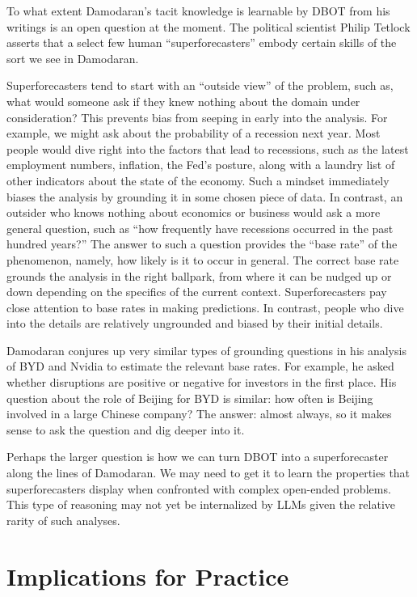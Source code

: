 \documentclass[]{interact}
\theoremstyle{plain}%
\theoremstyle{definition}
\theoremstyle{remark}
\begin{document}
To what extent Damodaran’s tacit knowledge is learnable by DBOT from his writings is an open question at the moment. The political scientist Philip Tetlock asserts that a select few human ``superforecasters'' embody certain skills of the sort we see in Damodaran. 

Superforecasters tend to start with an ``outside view'' of the problem, such as, what would someone ask if they knew nothing about the domain under consideration? This prevents bias from seeping in early into the analysis. For example, we might ask about the probability of a recession next year. Most people would dive right into the factors that lead to recessions, such as the latest employment numbers, inflation, the Fed’s posture, along with a laundry list of other indicators about the state of the economy. Such a mindset immediately biases the analysis by grounding it in some chosen piece of data. In contrast, an outsider who knows nothing about economics or business would ask a more general question, such as ``how frequently have recessions occurred in the past hundred years?'' The answer to such a question provides the “base rate” of the phenomenon, namely, how likely is it to occur in general. The correct base rate grounds the analysis in the right ballpark, from where it can be nudged up or down depending on the specifics of the current context. Superforecasters pay close attention to base rates in making predictions. In contrast, people who dive into the details are relatively ungrounded and biased by their initial details.

Damodaran conjures up very similar types of grounding questions in his analysis of BYD and Nvidia to estimate the relevant base rates. For example, he asked whether disruptions are positive or negative for investors in the first place. His question about the role of Beijing for BYD is similar: how often is Beijing involved in a large Chinese company? The answer: almost always, so it makes sense to ask the question and dig deeper into it.

Perhaps the larger question is how we can turn DBOT into a superforecaster along the lines of Damodaran. We may need to get it to learn the properties that superforecasters display when confronted with complex open-ended problems. This type of reasoning may not yet be internalized by LLMs given the relative rarity of such analyses.


\section{Implications for Practice}
\end{document}
